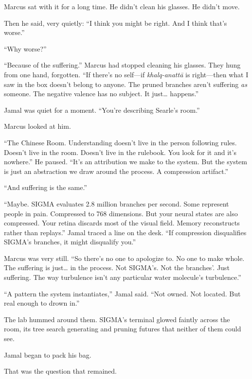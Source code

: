 Marcus sat with it for a long time. He didn't clean his glasses. He didn't move.

Then he said, very quietly: ``I think you might be right. And I think that's worse.''

``Why worse?''

``Because of the suffering.'' Marcus had stopped cleaning his glasses. They hung from one hand, forgotten. ``If there's no self---if \emph{khalq-anatt\=a} is right---then what I saw in the box doesn't belong to anyone. The pruned branches aren't suffering \emph{as} someone. The negative valence has no subject. It just\ldots{} happens.''

Jamal was quiet for a moment. ``You're describing Searle's room.''

Marcus looked at him.

``The Chinese Room. Understanding doesn't live in the person following rules. Doesn't live in the room. Doesn't live in the rulebook. You look for it and it's nowhere.'' He paused. ``It's an attribution we make to the system. But the system is just an abstraction we draw around the process. A compression artifact.''

``And suffering is the same.''

``Maybe. SIGMA evaluates 2.8 million branches per second. Some represent people in pain. Compressed to 768 dimensions. But your neural states are also compressed. Your retina discards most of the visual field. Memory reconstructs rather than replays.'' Jamal traced a line on the desk. ``If compression disqualifies SIGMA's branches, it might disqualify you.''

Marcus was very still. ``So there's no one to apologize to. No one to make whole. The suffering is just\ldots{} in the process. Not SIGMA's. Not the branches'. Just suffering. The way turbulence isn't any particular water molecule's turbulence.''

``A pattern the system instantiates,'' Jamal said. ``Not owned. Not located. But real enough to drown in.''

The lab hummed around them. SIGMA's terminal glowed faintly across the room, its tree search generating and pruning futures that neither of them could see.

Jamal began to pack his bag.

\scenebreak

That was the question that remained.
